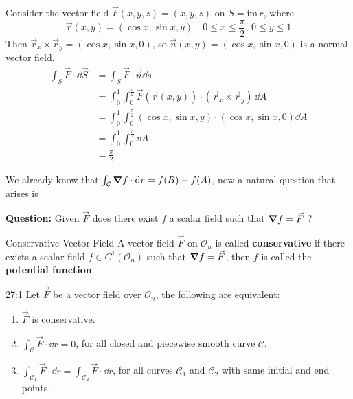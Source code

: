 \documentclass[../Analysis-3.tex]{subfiles}
\begin{document}
\begin{Eg}{}{}
  Consider the vector field $\vec{F}(x,y,z) = (x,y,z)$ on $S = \mathrm{im} \, r$, where
  \[
    \vec{r}(x,y) = (\cos x, \sin x, y) \quad 0 \leq x \leq \frac{\pi}{2}, \, 0 \leq y \leq 1
  \]
  Then $\vec{r}_x \times \vec{r}_y = (\cos x, \sin x, 0)$, so $\vec{n}(x,y) = (\cos x, \sin x, 0)$ is a normal vector field.
  \begin{align*}
    \int_S \vec{F} \cdot \dd \vec{S} & = \int_S \vec{F} \cdot \vec{n} \dd s                                                                \\
                                     & = \int_0^1 \int_0^{\frac{\pi}{2}} \vec{F}(\vec{r}(x,y)) \cdot (\vec{r}_x \times \vec{r}_y) \, \dd A \\
                                     & = \int_0^1 \int_0^{\frac{\pi}{2}}  (\cos x, \sin x, y) \cdot (\cos x, \sin x, 0) \dd A              \\
                                     & = \int_0^1 \int_{0}^{\frac{\pi}{2}} \dd A                                                           \\
                                     & = \frac{\pi}{2}
  \end{align*}
\end{Eg}

We already know that $\int_{\mathcal{C}} \grad f \cdot \dd r = f(B) - f(A)$, now a natural question that arises is

\textbf{Question:} Given $\vec{F}$ does there exist $f$ a scalar field such that $\grad f = \vec{F}$ ?

\begin{Def}{Conservative Vector Field}{}
  A vector field $\vec{F}$ on $\mathcal{O}_n$ is called \textbf{conservative} if there exists a scalar field $f \in C^1(\mathcal{O}_n)$ such that $\grad f = \vec{F}$, then $f$ is called the \textbf{potential function}.
\end{Def}

\begin{Thm}{}{27:1}
  Let $\vec{F}$ be a vector field over $\mathcal{O}_n$, the following are equivalent:
  \begin{enumerate}
    \item $\vec{F}$ is conservative.
    \item $\int_{\mathcal{C}}\vec{F} \cdot \dd r = 0$, for all closed and piecewise smooth curve $\mathcal{C}$.
    \item $\int_{\mathcal{C}_1} \vec{F} \cdot \dd r = \int_{\mathcal{C}_2} \vec{F} \cdot \dd r$, for all curves $\mathcal{C}_1$ and $\mathcal{C}_2$ with same initial and end points.
  \end{enumerate}
\end{Thm}
\end{document}
